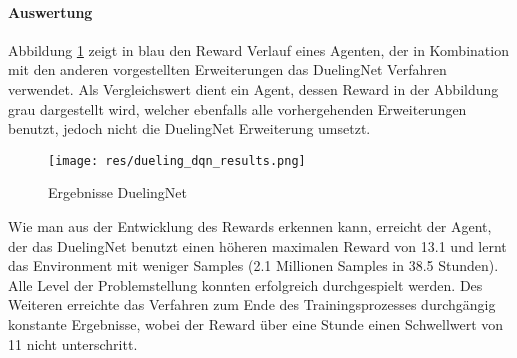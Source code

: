 \documentclass[11pt]{scrartcl}
\begin{document}
\paragraph*{Auswertung}
\noindent
\newline
Abbildung \ref{fig:dueling_dqn_results} zeigt in blau den Reward Verlauf eines Agenten,
der in Kombination mit den anderen vorgestellten Erweiterungen das DuelingNet Verfahren
verwendet. Als Vergleichswert dient ein Agent, dessen Reward in der Abbildung grau
dargestellt wird, welcher ebenfalls alle vorhergehenden Erweiterungen benutzt, 
jedoch nicht die DuelingNet Erweiterung umsetzt.
\begin{figure}[htp]
  \centering
  \texttt{[image: res/dueling\_dqn\_results.png]}
  \caption{Ergebnisse DuelingNet}
  \label{fig:dueling_dqn_results}
\end{figure}
\noindent
Wie man aus der Entwicklung des Rewards erkennen kann, erreicht der Agent, der das
DuelingNet benutzt einen höheren maximalen Reward von 13.1 und lernt das Environment mit
weniger Samples (2.1 Millionen Samples in 38.5 Stunden). Alle Level der Problemstellung
konnten erfolgreich durchgespielt werden. Des Weiteren erreichte das Verfahren zum Ende
des Trainingsprozesses durchgängig konstante Ergebnisse, wobei der Reward über eine Stunde
einen Schwellwert von 11 nicht unterschritt.
\end{document}
